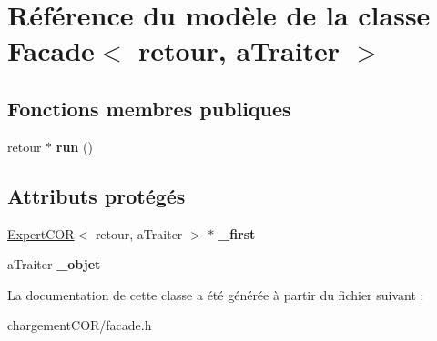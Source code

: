 \hypertarget{class_facade}{\section{Référence du modèle de la classe Facade$<$ retour, a\+Traiter $>$}
\label{class_facade}
}
\subsection*{Fonctions membres publiques}
\begin{DoxyCompactItemize}
\item 
\hypertarget{class_facade_a2765bcffe76eefe10056046fa0e1310d}{retour $\ast$ {\bfseries run} ()}\label{class_facade_a2765bcffe76eefe10056046fa0e1310d}

\end{DoxyCompactItemize}
\subsection*{Attributs protégés}
\begin{DoxyCompactItemize}
\item 
\hypertarget{class_facade_a44429d44d23a014898a344f1d8ee5ea3}{\hyperlink{class_expert_c_o_r}{Expert\+C\+O\+R}$<$ retour, a\+Traiter $>$ $\ast$ {\bfseries \+\_\+first}}\label{class_facade_a44429d44d23a014898a344f1d8ee5ea3}

\item 
\hypertarget{class_facade_af1abc64b47fc587b2b2a0db76c7c8ac9}{a\+Traiter {\bfseries \+\_\+objet}}\label{class_facade_af1abc64b47fc587b2b2a0db76c7c8ac9}

\end{DoxyCompactItemize}


La documentation de cette classe a été générée à partir du fichier suivant \+:\begin{DoxyCompactItemize}
\item 
chargement\+C\+O\+R/facade.\+h\end{DoxyCompactItemize}
